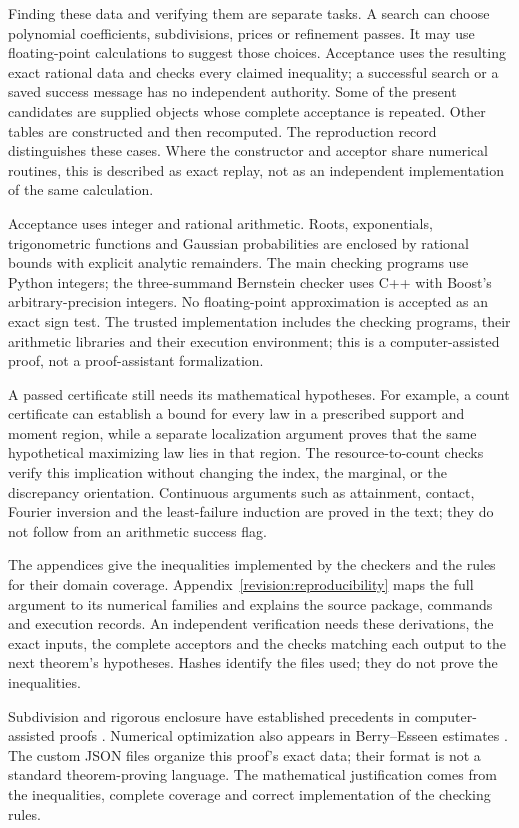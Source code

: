Finding these data and verifying them are separate tasks. A search can
choose polynomial coefficients, subdivisions, prices or refinement passes.
It may use floating-point calculations to suggest those choices. Acceptance
uses the resulting exact rational data and checks every claimed inequality;
a successful search or a saved success message has no independent authority.
Some of the present candidates are supplied objects whose complete
acceptance is repeated. Other tables are constructed and then recomputed.
The reproduction record distinguishes these cases. Where the constructor
and acceptor share numerical routines, this is described as exact replay,
not as an independent implementation of the same calculation.

Acceptance uses integer and rational arithmetic. Roots, exponentials,
trigonometric functions and Gaussian probabilities are enclosed by rational
bounds with explicit analytic remainders. The main checking programs use
Python integers; the three-summand Bernstein checker uses C++ with
Boost's arbitrary-precision integers. No floating-point approximation is
accepted as an exact sign test. The trusted implementation includes the
checking programs, their arithmetic libraries and their execution environment;
this is a computer-assisted proof, not a proof-assistant formalization.

A passed certificate still needs its mathematical hypotheses. For example,
a count certificate can establish a bound for every law in a prescribed
support and moment region, while a separate localization argument proves
that the same hypothetical maximizing law lies in that region. The
resource-to-count checks verify this implication without changing the
index, the marginal, or the discrepancy orientation. Continuous arguments
such as attainment, contact, Fourier inversion and the least-failure
induction are proved in the text; they do not follow from an arithmetic
success flag.

The appendices give the inequalities implemented by the checkers and the
rules for their domain coverage. Appendix~\ref{revision:reproducibility}
maps the full argument to its numerical families and explains the source
package, commands and execution records. An independent verification needs these derivations,
the exact inputs, the complete acceptors and the checks matching each
output to the next theorem's hypotheses. Hashes identify the files used;
they do not prove the inequalities.

Subdivision and rigorous enclosure have established precedents in
computer-assisted proofs \cite{SolovyevHales2013}. Numerical optimization
also appears in Berry--Esseen estimates \cite[Section~2]{Shevtsova2011}.
The custom JSON files organize this proof's exact data; their format is
not a standard theorem-proving language. The mathematical justification
comes from the inequalities, complete coverage and correct implementation
of the checking rules.

